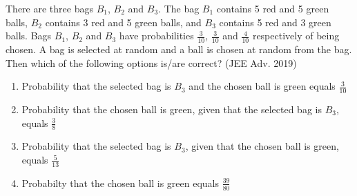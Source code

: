     \item There are three bags $B_1$, $B_2$ and $B_3$. The bag $B_1$ contains 5 red and 5 green balls, $B_2$ contains 3 red and 5 green balls, and $B_3$ contains 5 red and 3 green balls. Bags $B_1$, $B_2$ and $B_3$ have probabilities $\frac{3}{10}$, $\frac{3}{10}$ and $\frac{4}{10}$ respectively of being chosen. A bag is selected at random and a ball is chosen at random from the bag. Then which of the following options is/are correct?
    \hfill{(JEE Adv. 2019)}
    \begin{enumerate}
    
        \item Probability that the selected bag is $B_3$ and the chosen ball is green equals $\frac{3}{10}$
        \item Probability that the chosen ball is green, given that the selected bag is $B_3$, equals $\frac{3}{8}$
        \item Probability that the selected bag is $B_3$, given that the chosen ball is green, equals $\frac{5}{13}$
        \item Probabilty that the chosen ball is green equals $\frac{39}{80}$
       \end{enumerate}
